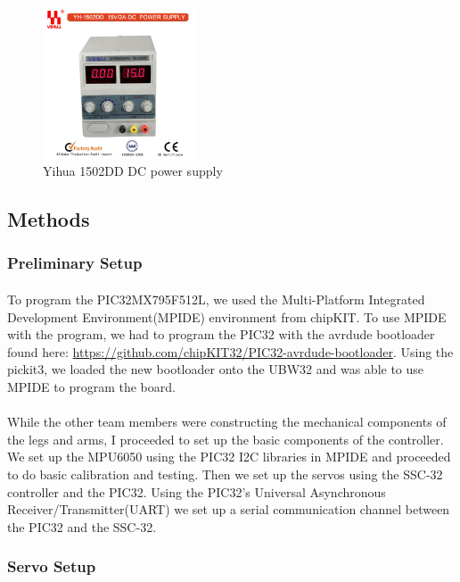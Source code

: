 \documentclass[letterpaper,12pt]{article}
\begin{document}
\begin{figure}
  \centering
    \includegraphics[width=0.4\textwidth]{figures/Power_Supply_YIHUA_1502DD.jpg}
  \caption{Yihua 1502DD DC power supply}
  \label{yihuafig}
\end{figure}

\subsection{Methods}
\subsubsection{Preliminary Setup}
\paragraph{}To program the PIC32MX795F512L, we used the Multi-Platform
Integrated Development Environment(MPIDE) environment from chipKIT. To use MPIDE
with the program, we had to program the PIC32 with the avrdude bootloader found
here: \url{https://github.com/chipKIT32/PIC32-avrdude-bootloader}. Using the
pickit3, we loaded the new bootloader onto the UBW32 and was able to use MPIDE
to program the board.

\paragraph{}While the other team members were constructing the mechanical
components of the legs and arms, I proceeded to set up the basic components of
the controller. We set up the MPU6050 using the PIC32 I2C libraries in MPIDE and
proceeded to do basic calibration and testing. Then we set up the servos using
the SSC-32 controller and the PIC32. Using the PIC32's Universal Asynchronous
Receiver/Transmitter(UART) we set up a serial communication channel between the
PIC32 and the SSC-32.  

\subsubsection{Servo Setup} 
\end{document}
